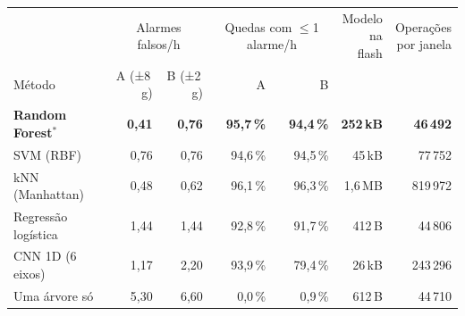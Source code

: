 \begin{tabular}{@{}l rr rr r r@{}}
\toprule
 & \multicolumn{2}{c}{Alarmes falsos/h} & \multicolumn{2}{c}{Quedas com $\le$1 alarme/h} & \makecell[r]{Modelo\\na flash} & \makecell[r]{Operações\\por janela} \\
\cmidrule(lr){2-3}\cmidrule(lr){4-5}
Método & A (±8\,g) & B (±2\,g) & A & B & & \\
\midrule
\textbf{Random Forest}$^{*}$ & \textbf{0,41} & \textbf{0,76} & \textbf{95,7\,\%} & \textbf{94,4\,\%} & \textbf{252\,kB} & \textbf{46\,492} \\
SVM (RBF) & 0,76 & 0,76 & 94,6\,\% & 94,5\,\% & 45\,kB & 77\,752 \\
kNN (Manhattan) & 0,48 & 0,62 & 96,1\,\% & 96,3\,\% & 1,6\,MB & 819\,972 \\
Regressão logística & 1,44 & 1,44 & 92,8\,\% & 91,7\,\% & 412\,B & 44\,806 \\
CNN 1D (6 eixos) & 1,17 & 2,20 & 93,9\,\% & 79,4\,\% & 26\,kB & 243\,296 \\
Uma árvore só & 5,30 & 6,60 & 0,0\,\% & 0,9\,\% & 612\,B & 44\,710 \\
\bottomrule
\end{tabular}

